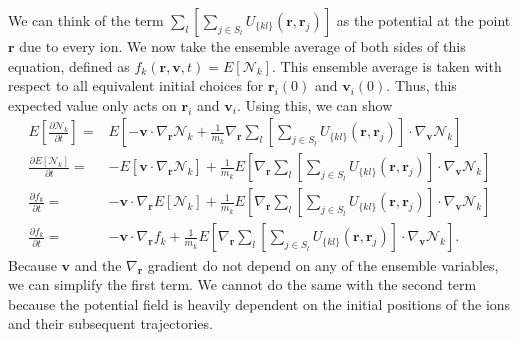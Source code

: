 \documentclass{article}
\begin{document}
We can think of the term $\sum_l\left[\sum_{j\in S_l}U_{\{kl\}}(\mathbf{r},\mathbf{r}_j)\right]$ as the potential at the point $\mathbf{r}$ due to every ion. We now take the ensemble average of both sides of this equation, defined as $f_k(\mathbf{r},\mathbf{v},t)=E[\mathcal{N}_k]$. This ensemble average is taken with respect to all equivalent initial choices for $\mathbf{r}_i(0)$ and $\mathbf{v}_i(0)$. Thus, this expected value only acts on $\mathbf{r}_i$ and $\mathbf{v}_i$. Using this, we can show
\begin{align*}
E\left[\frac{\partial \mathcal{N}_k}{\partial t}\right]=&E\left[-\mathbf{v}\cdot \nabla_\mathbf{r}\mathcal{N}_k+\frac{1}{m_k}
\nabla_\mathbf{r}\sum_l\left[\sum_{j\in S_l}U_{\{kl\}}(\mathbf{r},\mathbf{r}_j)\right]\cdot\nabla_\mathbf{v}\mathcal{N}_k
\right]\\
\frac{\partial E[\mathcal{N}_k]}{\partial t}=&-E\left[\mathbf{v}\cdot \nabla_\mathbf{r}\mathcal{N}_k\right]+\frac{1}{m_k}E\left[\nabla_\mathbf{r}\sum_l\left[\sum_{j\in S_l}U_{\{kl\}}(\mathbf{r},\mathbf{r}_j)\right]\cdot\nabla_\mathbf{v}\mathcal{N}_k\right]\\
\frac{\partial f_k}{\partial t}=&-\mathbf{v}\cdot\nabla_\mathbf{r}E[\mathcal{N}_k]+\frac{1}{m_k}E\left[\nabla_\mathbf{r}\sum_l\left[\sum_{j\in S_l}U_{\{kl\}}(\mathbf{r},\mathbf{r}_j)\right]\cdot\nabla_\mathbf{v}\mathcal{N}_k\right]\\
\frac{\partial f_k}{\partial t}=&-\mathbf{v}\cdot\nabla_\mathbf{r} f_k+\frac{1}{m_k}E\left[\nabla_\mathbf{r}\sum_l\left[\sum_{j\in S_l}U_{\{kl\}}(\mathbf{r},\mathbf{r}_j)\right]\cdot\nabla_\mathbf{v}\mathcal{N}_k\right].
\end{align*}
Because $\mathbf{v}$ and the $\nabla_\mathbf{r}$ gradient do not depend on any of the ensemble variables, we can simplify the first term. We cannot do the same with the second term because the potential field is heavily dependent on the initial positions of the ions and their subsequent trajectories.
\end{document}

